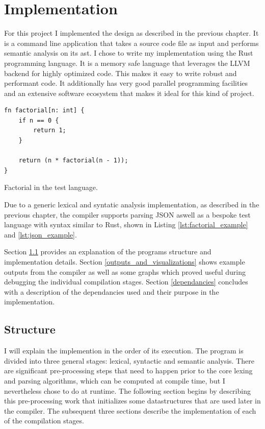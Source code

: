 \chapter{Implementation} \label{implementation}

For this project I implemented the design as described in the previous chapter.
It is a command line application that takes a source code file as input and
performs semantic analysis on its \gls{ast}. I chose to write my implementation
using the Rust programming language. It is a memory safe language that leverages
the LLVM backend for highly optimized code. This makes it easy to write
robust and performant code. It additionally has very good parallel programming
facilities and an extensive software ecosystem that makes it ideal for this kind
of project. 

\begin{listing}[t]
\begin{verbatim}
fn factorial[n: int] {
    if n == 0 {
        return 1;
    } 

    return (n * factorial(n - 1));
}
\end{verbatim}
\caption{Factorial in the test language.}
\label{lst:factorial_example}
\end{listing}

Due to a generic lexical and syntatic analysis implementation, as described in the previous chapter,
the compiler supports parsing JSON aswell as a bespoke test language with syntax similar to Rust,
shown in Listing \ref{lst:factorial_example} and \ref{lst:json_example}.

Section \ref{structure} provides an explanation of the programs structure and implementation
details.
\newline \newline
Section \ref{outputs_and_visualizations} shows example outputs from the compiler as well as some
graphs which proved useful during debugging the individual compilation stages.
\newline \newline
Section \ref{dependancies} concludes with a description of the dependancies used and their purpose
in the implementation.

\section{Structure} \label{structure}

I will explain the implemention in the order of its execution. The program is divided into three
general stages: lexical, syntactic and semantic analysis. There are significant pre-processing
steps that need to happen prior to the core lexing and parsing algorithms, which can be computed at
compile time, but I nevertheless chose to do at runtime. The following section begins by describing
this pre-processing work that initializes some datastructures that are used later in the compiler.
The subsequent three sections describe the implementation of each of the compilation stages.

